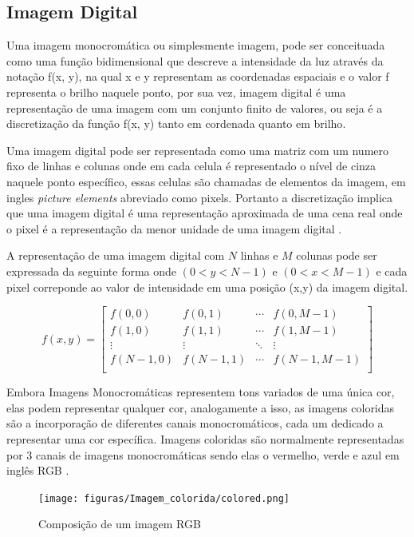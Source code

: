 \subsection[Imagem Digital]{Imagem Digital}

Uma imagem monocromática ou simplesmente imagem,  pode ser conceituada como uma função bidimensional que descreve a intensidade da luz através da notação f(x, y), na qual x e y representam as coordenadas espaciais e o valor f representa  o brilho naquele ponto, por sua vez, imagem digital é uma representação de uma imagem com um conjunto finito de valores, ou seja é a discretização da função f(x, y) tanto em cordenada quanto em brilho\cite{imagemMonocromatica}.

Uma imagem digital pode ser representada como uma matriz com um numero fixo de linhas e colunas onde em cada celula é representado o nível de cinza naquele ponto específico, essas celulas são chamadas de elementos da imagem, em ingles \textit{picture elements} abreviado como pixels. Portanto a discretização implica que uma imagem digital é uma representação aproximada de uma cena real onde o pixel é a representação da menor unidade de uma imagem digital \cite{imagemMonocromatica}. 

 
 A representação de uma imagem digital com $N$ linhas e  $M$ colunas  pode ser expressada da seguinte forma onde $(0 < y < N-1)$  e $(0 < x < M-1)$ e cada pixel correponde  ao valor de intensidade em uma posição (x,y) da imagem digital.

\[
    f(x,y) = \left[
        \begin{array}{cccc}
        f(0,0) & f(0,1) & \cdots & f(0,M-1) \\
        f(1,0) & f(1,1) & \cdots & f(1,M-1) \\
        \vdots & \vdots & \ddots & \vdots \\
        f(N-1,0) & f(N-1,1) & \cdots & f(N-1,M-1) \\
        \end{array}
    \right]
\]


Embora Imagens Monocromáticas representem tons variados de uma única cor, elas podem representar qualquer cor, analogamente a isso, as imagens coloridas são a incorporação de diferentes canais monocromáticos, cada um dedicado a representar uma cor específica. Imagens coloridas são normalmente representadas por 3 canais de imagens monocromáticas sendo elas o vermelho, verde e azul em inglês \ac{RGB} \cite{imagemIBM}.

\begin{figure}[!htb]
	\centering
	\texttt{[image: figuras/Imagem\_colorida/colored.png]}
	\caption{Composição de um imagem RGB}
	\label{fig:Composicao de um imagem RGB}
\end{figure}

